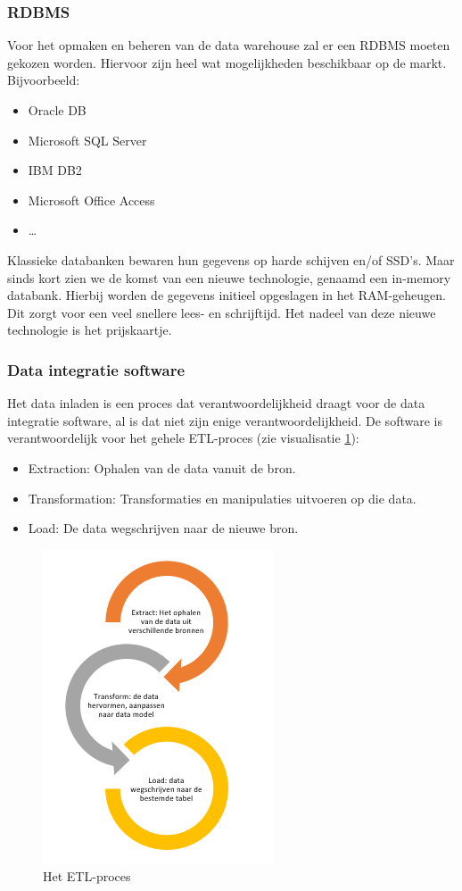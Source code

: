 \subsubsection{RDBMS}
Voor het opmaken en beheren van de data warehouse zal er een RDBMS moeten gekozen worden. Hiervoor zijn heel wat mogelijkheden beschikbaar op de markt. Bijvoorbeeld: 

\begin{itemize}
	\item Oracle DB
	\item Microsoft SQL Server
	\item IBM DB2
	\item Microsoft Office Access
	\item \ldots
\end{itemize} 

Klassieke databanken bewaren hun gegevens op harde schijven en/of SSD's. Maar sinds kort zien we de komst van een nieuwe technologie, genaamd een in-memory databank. Hierbij worden de gegevens initieel opgeslagen in het RAM-geheugen. Dit zorgt voor een veel snellere lees- en schrijftijd. Het nadeel van deze nieuwe technologie is het prijskaartje.

\subsubsection{Data integratie software}
\label{sec:etl}
Het data inladen is een proces dat verantwoordelijkheid draagt voor de data integratie software, al is dat niet zijn enige verantwoordelijkheid. De software is verantwoordelijk voor het gehele ETL-proces (zie visualisatie \ref{fig:etl}):

\begin{itemize}
	\item Extraction: Ophalen van de data vanuit de bron.
	\item Transformation: Transformaties en manipulaties uitvoeren op die data.
	\item Load: De data wegschrijven naar de nieuwe bron.
\end{itemize} 

\begin{figure}[h]
	\centering
	\includegraphics[scale=1]{../images/ETL.PNG}
	\caption{Het ETL-proces}
	\label{fig:etl}
\end{figure}

